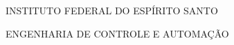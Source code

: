 {
    \center
    {\large\MakeUppercase{Instituto Federal do Espírito Santo}}
    \par
    \vspace{0.5cm}
    {\large\MakeUppercase{Engenharia de Controle e Automação}}
    \par
    \vfill
    {\large\MakeUppercase\imprimirautor}\par
    \vfill
    {\bfseries\large\MakeUppercase\imprimirtitulo}\par
    \vfill
         
    \vfill
    {\large\MakeUppercase\imprimirlocal}\par
    {\large\imprimirdata}\par
}
